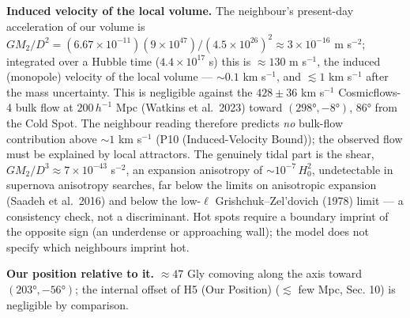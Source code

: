 \documentclass[
]{article}
\begin{document}
\textbf{Induced velocity of the local volume.} The neighbour's
present-day acceleration of our volume is
\(GM_2/D^2 = (6.67\times10^{-11})(9\times10^{47})/(4.5\times10^{26})^2 \approx 3\times10^{-16}\)
m s\(^{-2}\); integrated over a Hubble time (\(4.4\times10^{17}\) s)
this is \(\approx 130\) m s\(^{-1}\), the induced (monopole) velocity of
the local volume --- \(\sim\!0.1\) km s\(^{-1}\), and \(\lesssim 1\) km
s\(^{-1}\) after the mass uncertainty. This is negligible against the
\(428 \pm 36\) km s\(^{-1}\) Cosmicflows-4 bulk flow at \(200\,h^{-1}\)
Mpc (Watkins et al.~2023) toward \((298°, -8°)\), \(86°\) from the Cold
Spot. The neighbour reading therefore predicts \emph{no} bulk-flow
contribution above \(\sim\!1\) km s\(^{-1}\) (P10 (Induced-Velocity
Bound)); the observed flow must be explained by local attractors. The
genuinely tidal part is the shear, \(GM_2/D^3 \approx 7\times10^{-43}\)
s\(^{-2}\), an expansion anisotropy of \(\sim\!10^{-7}\,H_0^2\),
undetectable in supernova anisotropy searches, far below the limits on
anisotropic expansion (Saadeh et al.~2016) and below the low-\(\ell\)
Grishchuk--Zel'dovich (1978) limit --- a consistency check, not a
discriminant. Hot spots require a boundary imprint of the opposite sign
(an underdense or approaching wall); the model does not specify which
neighbours imprint hot.

\textbf{Our position relative to it.} \(\approx 47\) Gly comoving along
the axis toward \((203°, -56°)\); the internal offset of H5 (Our
Position) (\(\lesssim\) few Mpc, Sec. 10) is negligible by comparison.
\end{document}
